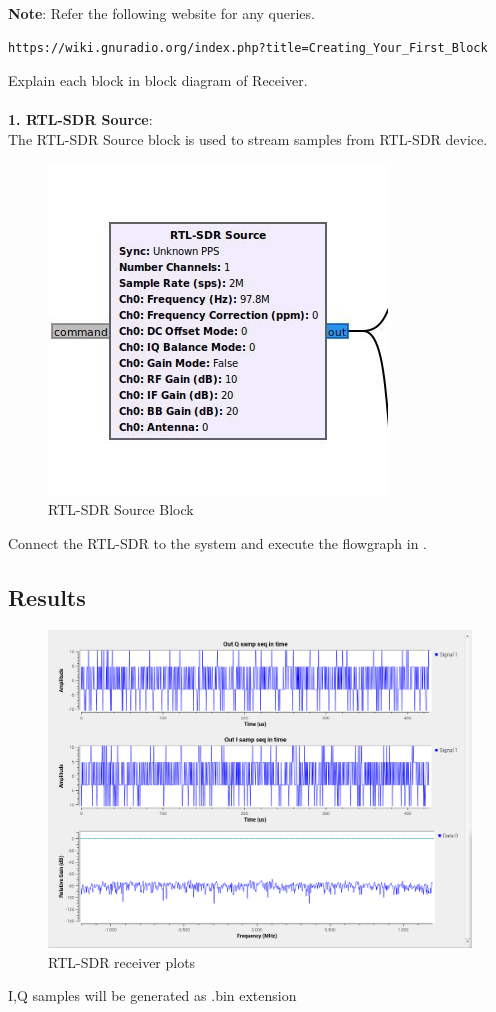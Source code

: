 \documentclass[11pt]{book}
\begin{document}
\textbf{Note}:
Refer the following website for any queries.
\begin{lstlisting}
https://wiki.gnuradio.org/index.php?title=Creating_Your_First_Block
\end{lstlisting}
 Explain each block in block diagram of Receiver.\\
	\solution \\
\textbf{1. RTL-SDR Source}:\\
The RTL-SDR Source block is used to stream samples from RTL-SDR device.
\begin{figure}[H]
\centering
\includegraphics[width=0.4\columnwidth]{figs/source_block.png}
\caption{RTL-SDR Source Block}
\label{fig:source block}
\end{figure}
Connect the RTL-SDR to the system and execute the flowgraph in .\\



\subsection{Results} 
\begin{figure}
\includegraphics[width=0.8\columnwidth]{figs/RTL_sdr_res.png}
\caption{RTL-SDR receiver plots}
\end{figure}
I,Q samples will be generated as .bin extension
\end{document}
